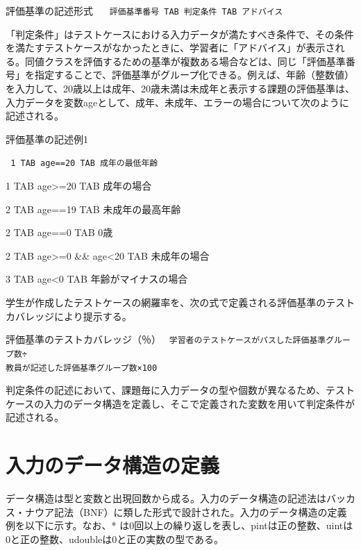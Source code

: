 \documentclass{tpu-sotu}
\begin{document}
\begin{minipage}[b]{.7\textwidth}
\begin{itembox}[l]{評価基準の記述形式}
{\tt
　評価基準番号 TAB 判定条件 TAB アドバイス
}
\end{itembox}
\end{minipage}

「判定条件」はテストケースにおける入力データが満たすべき条件で、その条件を満たすテストケースがなかったときに、学習者に「アドバイス」が表示される。同値クラスを評価するための基準が複数ある場合などは、同じ「評価基準番号」を指定することで、評価基準がグループ化できる。例えば、年齢（整数値）を入力して、20歳以上は成年、20歳未満は未成年と表示する課題の評価基準は、入力データを変数ageとして、成年、未成年、エラーの場合について次のように記述される。

\begin{minipage}[b]{.7\textwidth}
\begin{itembox}[l]{評価基準の記述例1}
{\tt
1 TAB age==20 TAB 成年の最低年齢

1 TAB age>=20 TAB 成年の場合

2 TAB age==19 TAB 未成年の最高年齢

2 TAB age==0 TAB 0歳

2 TAB age>=0 \&\& age<20 TAB 未成年の場合

3 TAB age<0 TAB 年齢がマイナスの場合
}
\end{itembox}
\end{minipage}

学生が作成したテストケースの網羅率を、次の式で定義される評価基準のテストカバレッジにより提示する。

\begin{minipage}[b]{.7\textwidth}
\begin{itembox}[l]{評価基準のテストカバレッジ（％）}
{\tt
学習者のテストケースがパスした評価基準グループ数÷\\教員が記述した評価基準グループ数×100
}
\end{itembox}
\end{minipage}

判定条件の記述において、課題毎に入力データの型や個数が異なるため、テストケースの入力のデータ構造を定義し、そこで定義された変数を用いて判定条件が記述される。
\section{入力のデータ構造の定義}
データ構造は型と変数と出現回数から成る。入力のデータ構造の記述法はバッカス・ナウア記法（BNF）に類した形式で設計された。入力のデータ構造の定義例を以下に示す。なお、* は0回以上の繰り返しを表し、pintは正の整数、uintは0と正の整数、udoubleは0と正の実数の型である。
\end{document}
